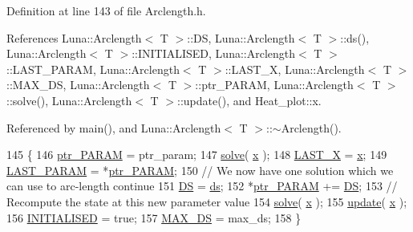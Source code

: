 Definition at line 143 of file Arclength.\+h.



References Luna\+::\+Arclength$<$ T $>$\+::\+DS, Luna\+::\+Arclength$<$ T $>$\+::ds(), Luna\+::\+Arclength$<$ T $>$\+::\+I\+N\+I\+T\+I\+A\+L\+I\+S\+ED, Luna\+::\+Arclength$<$ T $>$\+::\+L\+A\+S\+T\+\_\+\+P\+A\+R\+AM, Luna\+::\+Arclength$<$ T $>$\+::\+L\+A\+S\+T\+\_\+X, Luna\+::\+Arclength$<$ T $>$\+::\+M\+A\+X\+\_\+\+DS, Luna\+::\+Arclength$<$ T $>$\+::ptr\+\_\+\+P\+A\+R\+AM, Luna\+::\+Arclength$<$ T $>$\+::solve(), Luna\+::\+Arclength$<$ T $>$\+::update(), and Heat\+\_\+plot\+::x.



Referenced by main(), and Luna\+::\+Arclength$<$ T $>$\+::$\sim$\+Arclength().


\begin{DoxyCode}
145   \{
146     \hyperlink{classLuna_1_1Arclength_a984cead721a38abf1ab2a489052461e0}{ptr\_PARAM} = ptr\_param;
147     \hyperlink{classLuna_1_1Arclength_a0829d51bb49011f5ed56c25b7554d115}{solve}( \hyperlink{namespaceHeat__plot_aa88370c16b85b784ccbde3ed88bc1991}{x} );
148     \hyperlink{classLuna_1_1Arclength_a6d6ba83245b4dd616d265609a93035a2}{LAST\_X} = \hyperlink{namespaceHeat__plot_aa88370c16b85b784ccbde3ed88bc1991}{x};
149     \hyperlink{classLuna_1_1Arclength_a98e8241f24a16ea9f12e514d8d8f841b}{LAST\_PARAM} = *\hyperlink{classLuna_1_1Arclength_a984cead721a38abf1ab2a489052461e0}{ptr\_PARAM};
150     \textcolor{comment}{// We now have one solution which we can use to arc-length continue}
151     \hyperlink{classLuna_1_1Arclength_a6797d7b76d3e27c00b9c4c6ab9970405}{DS} = \hyperlink{classLuna_1_1Arclength_af92962a44295884704ebc6196ffbd6f6}{ds};
152     *\hyperlink{classLuna_1_1Arclength_a984cead721a38abf1ab2a489052461e0}{ptr\_PARAM} += \hyperlink{classLuna_1_1Arclength_a6797d7b76d3e27c00b9c4c6ab9970405}{DS};
153     \textcolor{comment}{// Recompute the state at this new parameter value}
154     \hyperlink{classLuna_1_1Arclength_a0829d51bb49011f5ed56c25b7554d115}{solve}( \hyperlink{namespaceHeat__plot_aa88370c16b85b784ccbde3ed88bc1991}{x} );
155     \hyperlink{classLuna_1_1Arclength_a8941ac2150d8a53aaefbf5825553c86b}{update}( \hyperlink{namespaceHeat__plot_aa88370c16b85b784ccbde3ed88bc1991}{x} );
156     \hyperlink{classLuna_1_1Arclength_a9bf5e636e7a0772f3ba5476ec2c83f6a}{INITIALISED} = \textcolor{keyword}{true};
157     \hyperlink{classLuna_1_1Arclength_a8fcd2b977d7ce78342f113d4e69ad8f1}{MAX\_DS} = max\_ds;
158   \}
\end{DoxyCode}
\mbox{\label{classLuna_1_1Arclength_a3bffa2fa38c73cd97155289bc902ccc6}} 
